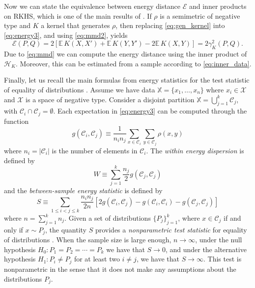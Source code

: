 \documentclass[aps,preprint,nofootinbib,floatfix]{revtex4-1}
\newcommand\Energy{\mathcal{E}}
\newcommand\E{\mathbb{E}}
\newcommand\kk{K}
\newcommand\Hk{{\mathcal{H}}_{\kk}}
\newcommand\C{{\mathcal{C}}}
\begin{document}
Now we can state the equivalence between energy distance $\Energy$ and
inner products on RKHS, which is one of the main results of
\cite{Sejdinovic2013}. If $\rho$ is a semimetric
of negative type and $\kk$ a kernel that generates $\rho$, then
replacing \eqref{eq:gen_kernel} into
\eqref{eq:energy3}, and using \eqref{eq:mmd2}, yields
\begin{equation} \label{eq:Erho}
\Energy(P, Q) = 
2 \left[ \E \, \kk(X, X') + \E \, \kk(Y, Y') - 2\E \, \kk(X, Y)\right] 
= 2 \gamma_\kk^2(P,Q) .
\end{equation}
Due to \eqref{eq:mmd} we can compute the energy distance using the inner 
product of $\Hk$. Moreover, this can be estimated from a sample
according to \eqref{eq:inner_data}.

Finally, let us recall the main formulas from energy statistics
for the test statistic of equality of distributions \cite{Szkely2013}. 
Assume we have data $\mathbb{X} = \{ x_1,\dotsc, x_n \}$ where
$x_i \in \mathcal{X}$ and $\mathcal{X}$ is a space of negative type.
Consider a disjoint partition $\mathbb{X} = \bigcup_{j=1}^k \C_j$, with
$\C_i \cap \C_j = \emptyset$.
Each expectation in 
\eqref{eq:energy3}
can be computed 
through the function
\begin{equation}
\label{eq:g_def}
g (\C_i, \C_j) \equiv 
\dfrac{1}{n_i n_j}
\sum_{x \in \C_i} 
\sum_{y \in \C_j} \rho(x, y)
\end{equation}
where $n_i = |\C_i|$ is the number of elements in 
$\C_i$. 
The \emph{within energy dispersion} is defined by
\begin{equation}
\label{eq:within}
W \equiv
\sum_{j=1}^{k} \dfrac{n_j}{2} g(\C_j, \C_j)
\end{equation}
and the \emph{between-sample energy statistic} is defined by
\begin{equation}
\label{eq:between}
S \equiv
\sum_{1 \le  i < j \le k } \dfrac{n_i n_{j}}{2 n} \left[
2 g(\C_i, \C_j) - 
g(\C_i, \C_i) - 
g(\C_j, \C_j)
\right]
\end{equation}
where $n = \sum_{j=1}^k n_j$.
Given a set of distributions
$\{ P_j\}_{j=1}^k$, where $x \in \C_j$ if and only if $x \sim P_j$, 
the quantity $S$ provides
a \emph{nonparametric test statistic} for equality of distributions
\cite{Szkely2013}.
When the sample size is large enough, $n\to \infty$,
under the null hypothesis $H_0: P_1=P_2=\dotsm=P_k$ we have that
$S\to 0$, 
and under
the alternative hypothesis $H_1: P_i \ne P_j$ for at least two $i\ne j$, 
we have that $S \to \infty$.
This test is nonparametric in the sense that it does not make any assumptions
about the distributions $P_j$.
\end{document}
